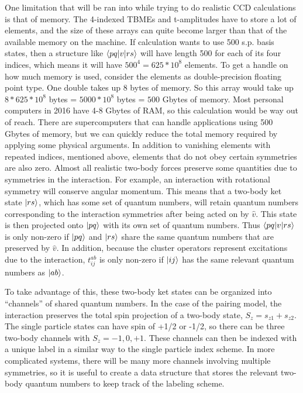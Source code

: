 One limitation that will be ran into while trying to do realistic CCD calculations is that of memory. The 4-indexed TBMEs and t-amplitudes have to store a lot of elements, and the size of these arrays can quite become larger than that of the available memory on the machine. If calculation wants to use 500 s.p. basis states, then a structure like $\braket{pq|v|rs}$ will have length 500 for each of its four indices, which means it will have $500^4 = 625*10^8$ elements. To get a handle on how much memory is used, consider the elements as double-precision floating point type. One double takes up 8 bytes of memory. So this array would take up $8*625*10^8$ bytes = $5000 * 10^8$ bytes = $500$ Gbytes of memory. Most personal computers in 2016 have 4-8 Gbytes of RAM, so this calculation would be way out of reach. There are supercomputers that can handle applications using 500 Gbytes of memory, but we can quickly reduce the total memory required by applying some physical arguments. In addition to vanishing elements with repeated indices, mentioned above, elements that do not obey certain symmetries are also zero. Almost all realistic two-body forces preserve some quantities due to symmetries in the interaction. For example, an interaction with rotational symmetry will conserve angular momentum. This means that a two-body ket state $\ket{rs}$, which has some set of quantum numbers, will retain quantum numbers corresponding to the interaction symmetries after being acted on by $\hat{v}$. This state is then projected onto $\ket{pq}$ with its own set of quantum numbers. Thus  $\braket{pq|v|rs}$ is only non-zero if $\ket{pq}$ and $\ket{rs}$ share the same quantum numbers that are preserved by $\hat{v}$. In addition, because the cluster operators represent excitations due to the interaction, $t_{ij}^{ab}$ is only non-zero if $\ket{ij}$ has the same relevant quantum numbers as $\ket{ab}$.

To take advantage of this, these two-body ket states can be organized into ``channels'' of shared quantum numbers. In the case of the pairing model, the interaction preserves the total spin projection of a two-body state, $S_{z}=s_{z1}+s_{z2}$. The single particle states can have spin of +1/2 or -1/2, so there can be three two-body channels with $S_{z}=-1,0,+1$. These channels can then be indexed with a unique label in a similar way to the single particle index scheme. In more complicated systems, there will be many more channels involving multiple symmetries, so it is useful to create a data structure that stores the relevant two-body quantum numbers to keep track of the labeling scheme.

